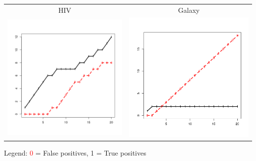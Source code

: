 \documentclass{beamer}
\begin{document}
\begin{frame}
\begin{center}
\begin{tabular}{cc}
HIV & Galaxy\\
\includegraphics[scale=0.15]{mar_HIV.png} & \includegraphics[scale=0.15]{mar_gal.png}\\
\end{tabular}

Legend: \textcolor{red}{0} = False positives, 1 = True positives
\end{center}
\end{frame}
\end{document}
